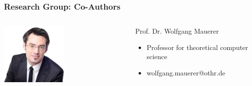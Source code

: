 \documentclass{beamer}
\begin{document}


	\begin{frame}
	\frametitle{Research Group: Co-Authors}
	\begin{minipage}[c]{1.0\linewidth}
		\begin{columns}
		\begin{column}{0.35\textwidth}
			\begin{center}
     		\includegraphics[width=0.5\textwidth]{pics/speakers_mauerer.jpeg}
			\end{center}
		\end{column}
		\begin{column}{0.7\textwidth}
		\begin{block}{Prof. Dr. Wolfgang Mauerer}
			\begin{itemize}
				\item Professor for theoretical computer science
				\item wolfgang.mauerer@othr.de
			\end{itemize}
		\end{block}
		\end{column}
		\end{columns}


\end{minipage}
\end{frame}
\end{document}
